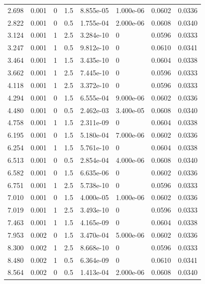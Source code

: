 \documentclass[preview]{standalone}
\begin{document}
{{\begin{tabular}{L{1.2cm}C{1.2cm} C{0.3cm}C{0.5cm} C{1.4cm}C{1.4cm} C{1.4cm}C{1.4cm}}
  2.698  &  0.001  & 0     & 1.5 &  8.855e-05  & 1.000e-06  & 0.0602 &  0.0336   \\ 
  2.822  &  0.001  & 0     & 0.5 &  1.755e-04  & 2.000e-06  & 0.0608 &  0.0340   \\ 
  3.124  &  0.001  & 1     & 2.5 &  3.284e-10  & 0  & 0.0596 &  0.0333   \\ 
  3.247  &  0.001  & 1     & 0.5 &  9.812e-10  & 0  & 0.0610 &  0.0341   \\ 
  3.464  &  0.001  & 1     & 1.5 &  3.435e-10  & 0  & 0.0604 &  0.0338   \\ 
  3.662  &  0.001  & 1     & 2.5 &  7.445e-10  & 0  & 0.0596 &  0.0333   \\ 
  4.118  &  0.001  & 1     & 2.5 &  3.372e-10  & 0  & 0.0596 &  0.0333   \\ 
  4.294  &  0.001  & 0     & 1.5 &  6.555e-04  & 9.000e-06  & 0.0602 &  0.0336   \\ 
  4.480  &  0.001  & 0     & 0.5 &  2.462e-03  & 3.400e-05  & 0.0608 &  0.0340   \\ 
  4.758  &  0.001  & 1     & 1.5 &  2.311e-09  & 0  & 0.0604 &  0.0338   \\ 
  6.195  &  0.001  & 0     & 1.5 &  5.180e-04  & 7.000e-06  & 0.0602 &  0.0336   \\ 
  6.254  &  0.001  & 1     & 1.5 &  5.761e-10  & 0  & 0.0604 &  0.0338   \\ 
  6.513  &  0.001  & 0     & 0.5 &  2.854e-04  & 4.000e-06  & 0.0608 &  0.0340   \\ 
  6.582  &  0.001  & 0     & 1.5 &  6.635e-06  & 0  & 0.0602 &  0.0336   \\ 
  6.751  &  0.001  & 1     & 2.5 &  5.738e-10  & 0  & 0.0596 &  0.0333   \\ 
  7.010  &  0.001  & 0     & 1.5 &  4.000e-05  & 1.000e-06  & 0.0602 &  0.0336   \\ 
  7.019  &  0.001  & 1     & 2.5 &  3.493e-10  & 0  & 0.0596 &  0.0333   \\ 
  7.463  &  0.001  & 1     & 1.5 &  4.165e-09  & 0  & 0.0604 &  0.0338   \\ 
  7.953  &  0.002  & 0     & 1.5 &  3.470e-04  & 5.000e-06  & 0.0602 &  0.0336   \\ 
  8.300  &  0.002  & 1     & 2.5 &  8.668e-10  & 0  & 0.0596 &  0.0333   \\ 
  8.480  &  0.002  & 1     & 0.5 &  6.364e-09  & 0  & 0.0610 &  0.0341   \\ 
  8.564  &  0.002  & 0     & 0.5 &  1.413e-04  & 2.000e-06  & 0.0608 &  0.0340   \\ 

\end{tabular}}}
\end{document}
